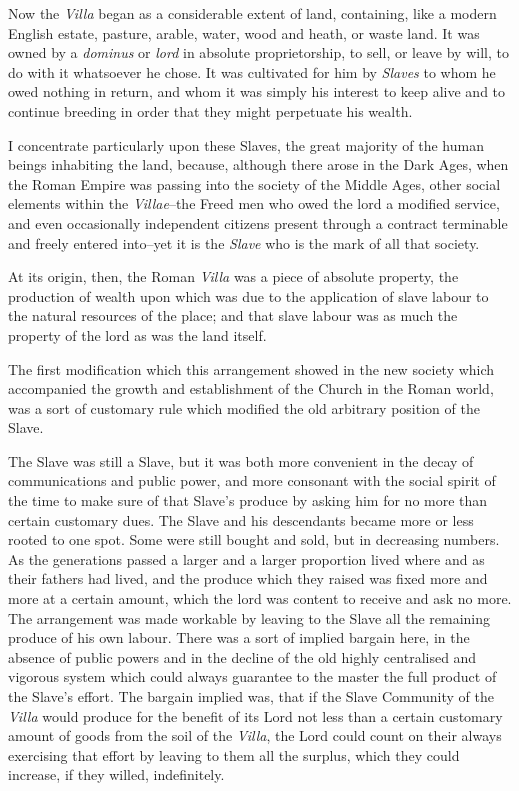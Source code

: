 \documentclass{book}
\begin{document}
Now the \emph{Villa} began as a considerable extent of land, containing, like a modern English estate, pasture, arable, water, wood and heath, or waste land. It was owned by a \emph{dominus} or \emph{lord} in absolute proprietorship, to sell, or leave by will, to do with it whatsoever he chose. It was cultivated for him by \emph{Slaves} to whom he owed nothing in return, and whom it was simply his interest to keep alive and to continue breeding in order that they might perpetuate his wealth.

I concentrate particularly upon these Slaves, the great majority of the human beings inhabiting the land, because, although there arose in the Dark Ages, when the Roman Empire was passing into the society of the Middle Ages, other social elements within the \emph{Villae}–the Freed men who owed the lord a modified service, and even occasionally independent citizens present through a contract terminable and freely entered into–yet it is the \emph{Slave} who is the mark of all that society.

At its origin, then, the Roman \emph{Villa} was a piece of absolute property, the production of wealth upon which was due to the application of slave labour to the natural resources of the place; and that slave labour was as much the property of the lord as was the land itself.

The first modification which this arrangement showed in the new society which accompanied the growth and establishment of the Church in the Roman world, was a sort of customary rule which modified the old arbitrary position of the Slave.

The Slave was still a Slave, but it was both more convenient in the decay of communications and public power, and more consonant with the social spirit of the time to make sure of that Slave’s produce by asking him for no more than certain customary dues. The Slave and his descendants became more or less rooted to one spot. Some were still bought and sold, but in decreasing numbers. As the generations passed a larger and a larger proportion lived where and as their fathers had lived, and the produce which they raised was fixed more and more at a certain amount, which the lord was content to receive and ask no more. The arrangement was made workable by leaving to the Slave all the remaining produce of his own labour. There was a sort of implied bargain here, in the absence of public powers and in the decline of the old highly centralised and vigorous system which could always guarantee to the master the full product of the Slave’s effort. The bargain implied was, that if the Slave Community of the \emph{Villa} would produce for the benefit of its Lord not less than a certain customary amount of goods from the soil of the \emph{Villa}, the Lord could count on their always exercising that effort by leaving to them all the surplus, which they could increase, if they willed, indefinitely.
\end{document}
